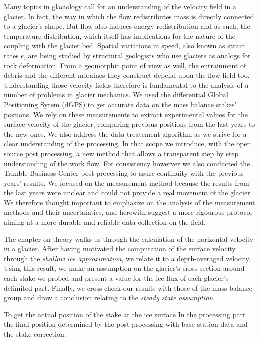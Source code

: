 Many topics in glaciology call for an understanding of the velocity field in a glacier. In fact, the way in which the flow redistributes mass is directly connected to a glacier's shape. But flow also induces energy redistribution and as such, the temperature distribution, which itself has implications for the nature of the coupling with the glacier bed. Spatial variations in speed, also known as strain rates $\epsilon$, are being studied by structural geologists who use glaciers as analogs for rock deformation. From a geomorphic point of view as well, the entrainment of debris and the different moraines they construct depend upon the flow field too. Understanding those velocity fields therefore is fundamental to the analysis of a number of problems in glacier mechanics.
We used the differential Global Positioning Sytem (dGPS) to get accurate data on the mass balance stakes' postions.
We rely on these measurements to extract experimental values for the surface velocity of the glacier, comparing previous positions from the last years to the new ones.
We also address the data treatement algorithm as we strive for a clear understanding of the processing.
In that scope we introduce, with the open source post processing, a new method that allows a transparent step by step understanding of the work flow.
For consistency howerver we also conducted the Trimble Business Center post processing to asure continuity with the previous years' results. 
We focused on the measurement method because the results from the last years were unclear and could not provide a real movement of the glacier.
We therefore thought important to emphasize on the analysis of the measurement methods and their uncertainties, and herewith suggest a more rigourous protocol aiming at a more durable and reliable data collection on the field. 

The chapter on theory walks us through the calculation of the horizontal velocity in a glacier. After having motivated the computation of the surface velocity through the \textit{shallow ice approximation}, we relate it to a depth-averaged velocity. Using this result, we make an assumption on the glacier's cross-section around each stake we probed and present a value for the ice flux of each glacier's delimited part. Finally, we cross-check our results with those of the mass-balance group and draw a conclusion relating to the \textit{steady state assumption}.

To get the actual position of the stake at the ice surface
In the processing part the final position determined by the post processing with base station data and the stake correction.




